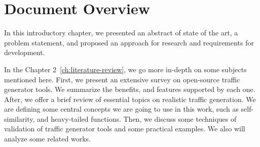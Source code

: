 



\section{Document Overview}


In this introductory chapter, we presented an abstract of state of the art, a problem statement, and proposed an approach for research and requirements for development.

In the Chapter 2~\ref{ch:literature-review}, we go more in-depth on some subjects mentioned here. First, we present an extensive survey on open-source traffic generator tools. We summarize the benefits, and features supported by each one. After, we offer a brief review of essential topics on realistic traffic generation. We are defining some central concepts we are going to use in this work, such as self-similarity, and heavy-tailed functions. Then, we discuss some techniques of validation of traffic generator tools and some practical examples. We also will analyze some related works. 

